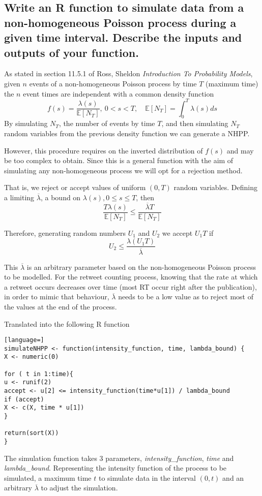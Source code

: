 \documentclass[11pt, a4paper]{article}
\begin{document}
\subsection{Write an R function to simulate data from a non-homogeneous Poisson process during a given time interval. Describe the inputs and outputs of your function.}

As stated in section 11.5.1 of Ross, Sheldon \textit{Introduction To Probability Models}, given $n$ events of a non-homogeneous Poisson process by time $T$ (maximum time) the $n$ event times are independent with a common density function
\[f(s) = \frac{\lambda(s)}{\mathbb{E}[N_T]},\ 0<s<T, \quad \mathbb{E}[N_T] = \int^T_0\lambda(s)ds\]
By simulating $N_T$, the number of events by time $T$, and then simulating $N_T$ random variables from the previous density function we can generate a NHPP.

However, this procedure requires on the inverted distribution of $f(s)$  and may be too complex to obtain. Since this is a general function with the aim of simulating any non-homogeneous process we will opt for a rejection method.

That is, we reject or accept values of uniform $(0, T)$ random variables. Defining a limiting $\overline\lambda$, a bound on $\lambda(s), 0\leq s \leq T$, then 
\[\frac{T \lambda(s)}{\mathbb{E}[N_T]} \leq \frac{\overline\lambda T}{\mathbb{E}[N_T]} \]

Therefore, generating random numbers $U_1$ and $U_2$ we accept $U_1T$ if
\[U_2 \leq \frac{\lambda(U_1T)}{\overline \lambda}\]

This $\overline\lambda$ is an arbitrary parameter based on the non-homogeneous Poisson process to be modelled. For the retweet counting process, knowing that the rate at which a retweet occurs decreases over time (most RT occur right after the publication), in order to mimic that behaviour, $\overline\lambda$ needs to be a low value as to reject most of the values at the end of the process.

Translated into the following R function
\begin{lstlisting}[language=]
simulateNHPP <- function(intensity_function, time, lambda_bound) {
X <- numeric(0)

for ( t in 1:time){
u <- runif(2)
accept <- u[2] <= intensity_function(time*u[1]) / lambda_bound
if (accept)
X <- c(X, time * u[1])
}

return(sort(X))
}
\end{lstlisting}

The simulation function takes 3 parameters, \textit{intensity\_function}, \textit{time} and \textit{lambda\_bound}. Representing the intensity function of the process to be simulated, a maximum time $t$ to simulate data in the interval $(0, t)$ and an arbitrary $\overline \lambda$ to adjust the simulation.
\end{document}
